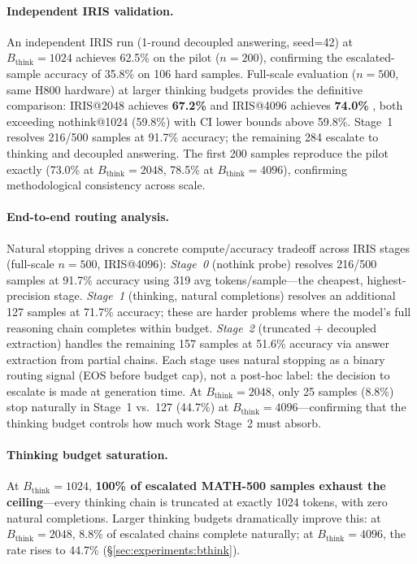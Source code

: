 \paragraph{Independent IRIS validation.}
An independent IRIS run (1-round decoupled answering, seed=42) at $B_{\text{think}}{=}1024$ achieves 62.5\%  on the pilot ($n{=}200$), confirming the escalated-sample accuracy of 35.8\% on 106 hard samples.
Full-scale evaluation ($n{=}500$, same H800 hardware) at larger thinking budgets provides the definitive comparison: IRIS@2048 achieves \textbf{67.2\%}  and IRIS@4096 achieves \textbf{74.0\%} , both exceeding nothink@1024 (59.8\%) with CI lower bounds above 59.8\%.
Stage~1 resolves 216/500 samples at 91.7\% accuracy; the remaining 284 escalate to thinking and decoupled answering.
The first 200 samples reproduce the pilot exactly (73.0\% at $B_{\text{think}}{=}2048$, 78.5\% at $B_{\text{think}}{=}4096$), confirming methodological consistency across scale.

\paragraph{End-to-end routing analysis.}
Natural stopping drives a concrete compute/accuracy tradeoff across IRIS stages (full-scale $n{=}500$, IRIS@4096):
\emph{Stage~0} (nothink probe) resolves 216/500 samples at 91.7\% accuracy using 319 avg tokens/sample---the cheapest, highest-precision stage.
\emph{Stage~1} (thinking, natural completions) resolves an additional 127 samples at 71.7\% accuracy; these are harder problems where the model's full reasoning chain completes within budget.
\emph{Stage~2} (truncated + decoupled extraction) handles the remaining 157 samples at 51.6\% accuracy via answer extraction from partial chains.
Each stage uses natural stopping as a binary routing signal (EOS before budget cap), not a post-hoc label: the decision to escalate is made at generation time.
At $B_{\text{think}}{=}2048$, only 25 samples (8.8\%) stop naturally in Stage~1 vs.\ 127 (44.7\%) at $B_{\text{think}}{=}4096$---confirming that the thinking budget controls how much work Stage~2 must absorb.

\paragraph{Thinking budget saturation.}
At $B_{\text{think}}{=}1024$, \textbf{100\% of escalated MATH-500 samples exhaust the ceiling}---every thinking chain is truncated at exactly 1024 tokens, with zero natural completions.
Larger thinking budgets dramatically improve this: at $B_{\text{think}}{=}2048$, 8.8\% of escalated chains complete naturally; at $B_{\text{think}}{=}4096$, the rate rises to 44.7\% (\S\ref{sec:experiments:bthink}).

